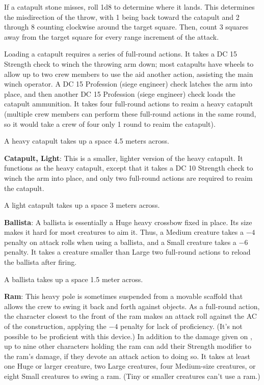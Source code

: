 If a catapult stone misses, roll 1d8 to determine where it lands. This determines the misdirection of the throw, with 1 being back toward the catapult and 2 through 8 counting clockwise around the target square. Then, count 3 squares away from the target square for every range increment of the attack.

Loading a catapult requires a series of full-round actions. It takes a DC 15 Strength check to winch the throwing arm down; most catapults have wheels to allow up to two crew members to use the aid another action, assisting the main winch operator. A DC 15 Profession (siege engineer) check latches the arm into place, and then another DC 15 Profession (siege engineer) check loads the catapult ammunition. It takes four full-round actions to reaim a heavy catapult (multiple crew members can perform these full-round actions in the same round, so it would take a crew of four only 1 round to reaim the catapult).

A heavy catapult takes up a space 4.5 meters across.

\textbf{Catapult, Light}: This is a smaller, lighter version of the heavy catapult. It functions as the heavy catapult, except that it takes a DC 10 Strength check to winch the arm into place, and only two full-round actions are required to reaim the catapult.

A light catapult takes up a space 3 meters across.

\textbf{Ballista}: A ballista is essentially a Huge heavy crossbow fixed in place. Its size makes it hard for most creatures to aim it. Thus, a Medium creature takes a $-4$ penalty on attack rolls when using a ballista, and a Small creature takes a $-6$ penalty. It takes a creature smaller than Large two full-round actions to reload the ballista after firing.

A ballista takes up a space 1.5 meter across.

\textbf{Ram}: This heavy pole is sometimes suspended from a movable scaffold that allows the crew to swing it back and forth against objects. As a full-round action, the character closest to the front of the ram makes an attack roll against the AC of the construction, applying the $-4$ penalty for lack of proficiency. (It's not possible to be proficient with this device.) In addition to the damage given on , up to nine other characters holding the ram can add their Strength modifier to the ram's damage, if they devote an attack action to doing so. It takes at least one Huge or larger creature, two Large creatures, four Medium-size creatures, or eight Small creatures to swing a ram. (Tiny or smaller creatures can't use a ram.)

